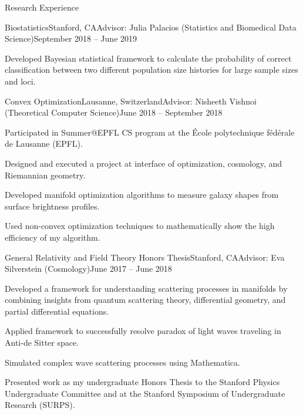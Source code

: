 \begin{rSection}{Research Experience}
\begin{rSubsection}{Biostatistics}{Stanford, CA}{Advisor: Julia Palacios (Statistics and Biomedical Data Science)}{September 2018 -- June 2019}
\item Developed Bayesian statistical framework to calculate the probability of correct classification between two different population size histories for large sample sizes and loci. 


\end{rSubsection}

\begin{rSubsection}{ Convex Optimization}{Lausanne, Switzerland}{Advisor: Nisheeth Vishnoi (Theoretical Computer Science)}{June 2018 -- September 2018}
\item Participated in Summer@EPFL CS program at the \'Ecole polytechnique f\'ed\'erale de Lausanne (EPFL).
\item Designed and executed a project at interface of optimization, cosmology, and Riemannian geometry.
\item Developed manifold optimization algorithms to measure galaxy shapes from surface brightness profiles.
\item Used non-convex optimization techniques to mathematically show the high efficiency of my algorithm.
\end{rSubsection}
\begin{rSubsection}{General Relativity and Field Theory Honors Thesis}{Stanford, CA}{Advisor: Eva Silverstein (Cosmology)}{June 2017 -- June 2018}
\item Developed a framework for understanding scattering processes in manifolds by combining insights from quantum scattering theory, differential geometry, and partial differential equations. 
\item Applied framework to successfully resolve paradox of light waves traveling in Anti-de Sitter space. 
\item Simulated complex wave scattering processes using Mathematica. 
\item Presented work as my undergraduate Honors Thesis to the Stanford Physics Undergraduate Committee and at the Stanford Symposium of Undergraduate Research (SURPS).                        
\end{rSubsection}
\end{rSection}


